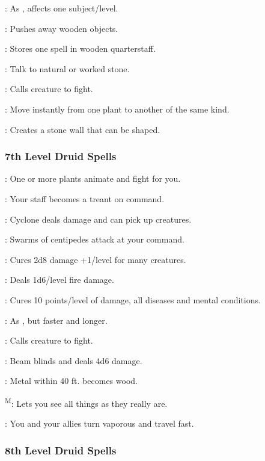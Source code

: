 : As , affects one subject/level.

: Pushes away wooden objects.

: Stores one spell in wooden quarterstaff.

: Talk to natural or worked stone.

: Calls creature to fight.

: Move instantly from one plant to another of the same kind.

: Creates a stone wall that can be shaped.

\subsubsection{7th Level Druid Spells}

: One or more plants animate and fight for you.

: Your staff becomes a treant on command.

: Cyclone deals damage and can pick up creatures.

: Swarms of centipedes attack at your command.

: Cures 2d8 damage +1/level for many creatures.

: Deals 1d6/level fire damage.

: Cures 10 points/level of damage, all diseases and mental conditions.

: As , but faster and longer.

: Calls creature to fight.

: Beam blinds and deals 4d6 damage.

: Metal within 40 ft. becomes wood.

\textsuperscript{M}: Lets you see all things as they really are.

: You and your allies turn vaporous and travel fast.

\subsubsection{8th Level Druid Spells}


